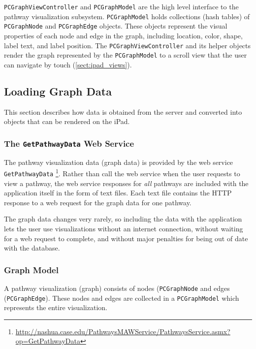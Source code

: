 \texttt{PCGraphViewController} and \texttt{PCGraphModel} are the high level
interface to the pathway visualization subsystem. \texttt{PCGraphModel} holds
collections (hash tables) of \texttt{PCGraphNode} and \texttt{PCGraphEdge}
objects. These objects represent the visual properties of each node and edge in
the graph, including location, color, shape, label text, and label position. The
\texttt{PCGraphViewController} and its helper objects render the graph
represented by the \texttt{PCGraphModel} to a scroll view
that the user can navigate by touch (\ref{sect:ipad_views}). 

\subsection{Loading Graph Data}
\label{sect:smda_viz_data}

This section describes how data is obtained from the \pathcasemaw server and
converted into objects that can be rendered on the iPad.

\subsubsection{The \texttt{GetPathwayData} Web Service}

The pathway visualization data (graph data) is provided by the \pathcasemaw web
service \texttt{GetPathwayData}
\footnote{\url{http://nashua.case.edu/PathwaysMAWService/PathwaysService.asmx?op=GetPathwayData}}.
Rather than call the web service when the user requests to view a pathway, the
web service responses for \emph{all} pathways are included with the application
itself in the form of text files. Each text file contains the HTTP response to a
web request for the graph data for one pathway.

The graph data changes very rarely, so including the data with the application
lets the user use visualizations without an internet connection, without waiting
for a web request to complete, and without major penalties for being out of date
with the \pathcasemaw database.

\subsubsection{Graph Model}

A pathway visualization (graph) consists of nodes (\texttt{PCGraphNode} and
edges (\texttt{PCGraphEdge}). These nodes and edges are collected in a
\texttt{PCGraphModel} which represents the entire visualization.

